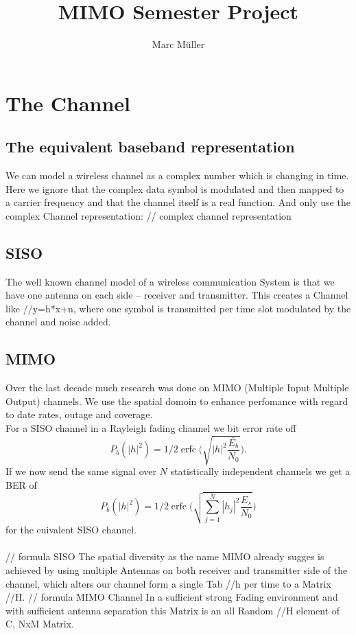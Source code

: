 \documentclass[9pt,draft]{report}
\DeclareMathOperator\erfc{erfc}
\begin{document}
\author{Marc Müller}
\title{MIMO Semester Project}

\chapter{The Channel}
\section{The equivalent baseband representation}
We can model a wireless channel as a complex number which is changing in time. Here we ignore that the complex data symbol is modulated and then mapped to a carrier frequency and that the channel itself is a real function. And only use the complex Channel representation:
// complex channel representation

\section{SISO}
The well known channel model of a wireless communication System is that we have one antenna on each side – receiver and transmitter. This creates a Channel like //y=h*x+n, where one symbol is transmitted per time slot modulated by the channel and noise added.

\section{MIMO}

Over the last decade much research was done on MIMO (Multiple Input Multiple Output) channels. We use the spatial domoin to enhance perfomance with regard to date rates, outage and coverage.\\

For a SISO channel in a Rayleigh fading channel we bit error rate off
$$
	P_b(|h|^2) = 1/2 \erfc{\Biggl(\sqrt{|h|^2\frac{\bar{E_b}}{N_0}}\Biggr)}.
$$
If we now send the same signal over $N$ statistically independent channels we get a BER of
$$
	P_b(|h|^2) = 1/2 \erfc{\Biggl(\sqrt{\sum_{j=1}^N{|h_j|^2\frac{E_s}{N_0}}}\Biggr)}
$$
for the euivalent SISO channel.
\\ \\

// formula SISO
The spatial diversity as the name MIMO already sugges is achieved by using multiple Antennas on both receiver and transmitter side of the channel, which alters our channel form a single Tab //h per time to a Matrix //H.
// formula MIMO Channel
In a sufficient strong Fading environment and with sufficient antenna separation this Matrix is an all Random //H element of C, NxM Matrix.
\end{document}
